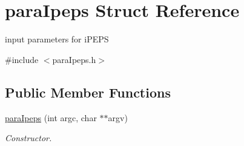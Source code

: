 \hypertarget{structparaIpeps}{}\section{para\+Ipeps Struct Reference}
\label{structparaIpeps}


input parameters for i\+P\+E\+PS  




{\ttfamily \#include $<$para\+Ipeps.\+h$>$}

\subsection*{Public Member Functions}
\begin{DoxyCompactItemize}
\item 
\hyperlink{structparaIpeps_ad978aa3d690c425bdc6e6f87a2675ee3}{para\+Ipeps} (int argc, char $\ast$$\ast$argv)\hypertarget{structparaIpeps_ad978aa3d690c425bdc6e6f87a2675ee3}{}\label{structparaIpeps_ad978aa3d690c425bdc6e6f87a2675ee3}

\begin{DoxyCompactList}\small\item\em Constructor. \end{DoxyCompactList}\end{DoxyCompactItemize}
